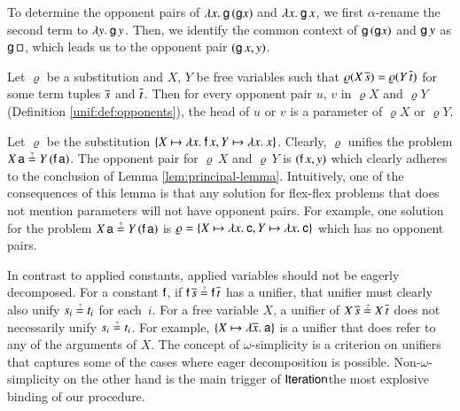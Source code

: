 \begin{exa} To determine the opponent pairs of $\lambda x.\> \mathsf{g} \, (\mathsf{g} x)$
  and $\lambda x.\> \mathsf{g} \, x$, we first $\alpha$-rename the second term to 
  $\lambda y.\> \mathsf{g}\,{y}$. Then, we identify the common context of $\mathsf{g} \, (\mathsf{g} x)$ and $\mathsf{g} \, y$
  as $\mathsf{g} \, \square $, which leads us to the opponent pair $(\mathsf{g} \, x, y)$.
\end{exa}

\begin{lemma}[$\jp L{3\text{ (1)}}$]\label{lem:principal-lemma}Let $\varrho$ be a substitution
    and $X$, $Y$ be free variables such that $\varrho(X\,\overline{s})=\varrho(Y\,\overline{t})$
    for some term tuples $\overline{s}$ and $\overline{t}$. Then for every opponent
    pair $u$, $v$ in $\varrho X$ and $\varrho Y$
    (Definition \ref{unif:def:opponents}), the head of $u$ or $v$ is a parameter
    of $\varrho X$ or $\varrho Y$.
    \end{lemma}
\begin{exa}
  Let $\varrho$ be the substitution $\{ X \mapsto \lambda x.\> \mathsf{f} \, x, Y
  \mapsto \lambda x.\> x \}$. Clearly, $\varrho$ unifies the problem $X \, \cst{a}
  \unif Y \, (\cst{f} \, \cst{a})$. The opponent pair for $\varrho\,X$ and $\varrho\,Y$
  is $(\mathsf{f} \, x, y)$ which clearly adheres to the conclusion of Lemma \ref{lem:principal-lemma}.
%
  Intuitively, one of the consequences of this lemma is that any solution for
  flex-flex problems that does not mention parameters will not have opponent pairs. 
  For example, one solution for the 
  problem $X \, \cst{a}
  \unif Y \, (\cst{f} \, \cst{a})$ is $\varrho = \{ X \mapsto \lambda x.\> \mathsf{c}, Y \mapsto \lambda x.\> \mathsf{c} \}$
  which has no opponent pairs.
\end{exa}
  
  In contrast to applied constants, applied variables should not be eagerly decomposed.
  For a constant $\mathsf{f}$, if $\cst{f}\,\seq s \unif \cst{f}\,\seq t$ has a unifier,
  that unifier must clearly also unify $s_{i} \unif t_{i}$ for each~$i$. 
  For a free variable $X$, a unifier of $X\,\seq s \unif X\,\seq t$ does not necessarily
unify $s_{i} \unif t_{i}$. For example, $\{X \mapsto \lambda \overline{x}.\> \mathsf{a}\}$ is a unifier that does
  refer to any of the arguments of $X$.
  The concept of $\omega$-simplicity is
  a criterion on unifiers that captures some of the cases where eager decomposition is possible.
  Non-$\omega$-simplicity
  on the other hand is the main trigger of $\textsf{Iteration}$\textemdash the
  most explosive binding of our procedure.
  
